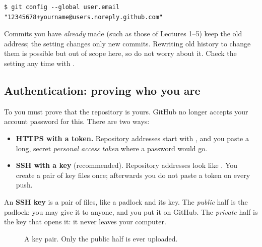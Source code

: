 \begin{lstlisting}
$ git config --global user.email "12345678+yourname@users.noreply.github.com"
\end{lstlisting}

Commits you have \emph{already} made (such as those of Lectures 1--5) keep the old address; the setting changes only new commits. Rewriting old history to change them is possible but out of scope here, so do not worry about it. Check the setting any time with .

\subsection{Authentication: proving who you are}

To  you must prove that the repository is yours. GitHub no longer accepts your account password for this. There are two ways:

\begin{itemize}
  \item \textbf{HTTPS with a token.} Repository addresses start with , and you paste a long, secret \emph{personal access token} where a password would go.
  \item \textbf{SSH with a key} (recommended). Repository addresses look like \allowbreak{}. You create a pair of key files once; afterwards you do not paste a token on every push.
\end{itemize}

An \textbf{SSH key} is a pair of files, like a padlock and its key. The \emph{public} half is the padlock: you may give it to anyone, and you put it on GitHub. The \emph{private} half is the key that opens it: it never leaves your computer.

\begin{figure}[H]
\centering
{}
\caption{A key pair. Only the public half is ever uploaded.}
\label{fig:keys}
\end{figure}

